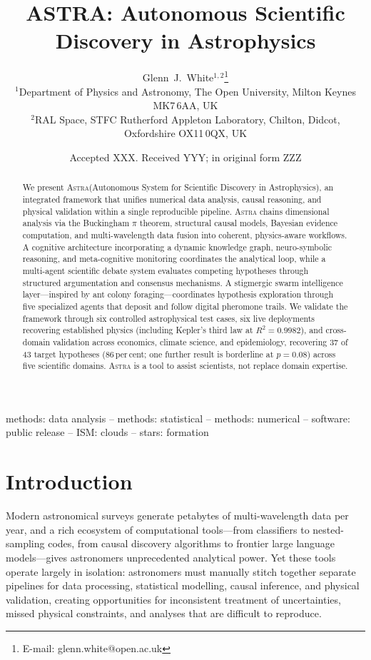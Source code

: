 \documentclass[usenatbib]{rasti}
\title[ASTRA: Autonomous Scientific Discovery]{ASTRA: Autonomous Scientific Discovery in Astrophysics}
\author[White]{
Glenn~J.~White$^{1,2}$\thanks{E-mail: glenn.white@open.ac.uk}\\
$^{1}$Department of Physics and Astronomy, The Open University, Milton Keynes MK7\,6AA, UK\\
$^{2}$RAL Space, STFC Rutherford Appleton Laboratory, Chilton, Didcot, Oxfordshire OX11\,0QX, UK
}
\date{Accepted XXX. Received YYY; in original form ZZZ}
\newcommand{\astra}{\textsc{Astra}\xspace}
\begin{document}
\maketitle

\begin{abstract}
We present \astra (Autonomous System for Scientific Discovery in Astrophysics), an integrated framework that unifies numerical data analysis, causal reasoning, and physical validation within a single reproducible pipeline.
\astra chains dimensional analysis via the Buckingham $\pi$ theorem, structural causal models, Bayesian evidence computation, and multi-wavelength data fusion into coherent, physics-aware workflows.
A cognitive architecture incorporating a dynamic knowledge graph, neuro-symbolic reasoning, and meta-cognitive monitoring coordinates the analytical loop, while a multi-agent scientific debate system evaluates competing hypotheses through structured argumentation and consensus mechanisms.
A stigmergic swarm intelligence layer---inspired by ant colony foraging---coordinates hypothesis exploration through five specialized agents that deposit and follow digital pheromone trails.
We validate the framework through six controlled astrophysical test cases, six live deployments recovering established physics (including Kepler's third law at $R^{2}=0.9982$), and cross-domain validation across economics, climate science, and epidemiology, recovering 37 of 43 target hypotheses (86\,per\,cent; one further result is borderline at $p = 0.08$) across five scientific domains.
\astra is a tool to assist scientists, not replace domain expertise.
\end{abstract}

\begin{keywords}
methods: data analysis -- methods: statistical -- methods: numerical -- software: public release -- ISM: clouds -- stars: formation
\end{keywords}

\section{Introduction}
\label{sec:introduction}

Modern astronomical surveys generate petabytes of multi-wavelength data per year, and a rich ecosystem of computational tools---from classifiers to nested-sampling codes, from causal discovery algorithms \citep{Spirtes2000} to frontier large language models---gives astronomers unprecedented analytical power.
Yet these tools operate largely in isolation: astronomers must manually stitch together separate pipelines for data processing, statistical modelling, causal inference, and physical validation, creating opportunities for inconsistent treatment of uncertainties, missed physical constraints, and analyses that are difficult to reproduce.
\end{document}
